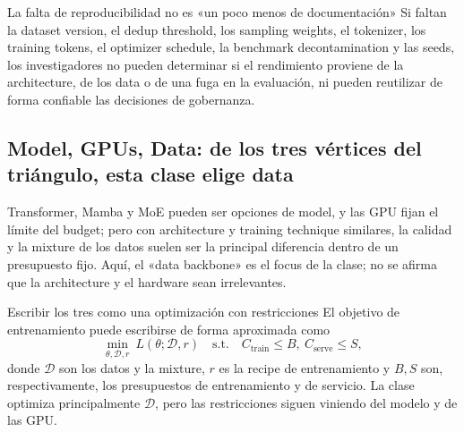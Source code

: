 \begin{warningbox}{La falta de reproducibilidad no es «un poco menos de documentación»}
Si faltan la dataset version, el dedup threshold, los sampling weights, el tokenizer, los training tokens, el optimizer schedule, la benchmark decontamination y las seeds, los investigadores no pueden determinar si el rendimiento proviene de la architecture, de los data o de una fuga en la evaluación, ni pueden reutilizar de forma confiable las decisiones de gobernanza.
\end{warningbox}


\subsection{Model, GPUs, Data: de los tres vértices del triángulo, esta clase elige data}

Transformer, Mamba y MoE pueden ser opciones de model, y las GPU fijan el límite del budget; pero con architecture y training technique similares, la calidad y la mixture de los datos suelen ser la principal diferencia dentro de un presupuesto fijo. Aquí, el «data backbone» es el focus de la clase; no se afirma que la architecture y el hardware sean irrelevantes.


\begin{knowledgebox}{Escribir los tres como una optimización con restricciones}
El objetivo de entrenamiento puede escribirse de forma aproximada como
\[
\min_{\theta,\mathcal{D},r}\ L(\theta;\mathcal{D},r)
\quad\text{s.t.}\quad
C_{\text{train}}\le B,\ C_{\text{serve}}\le S,
\]
donde $\mathcal{D}$ son los datos y la mixture, $r$ es la recipe de entrenamiento y $B,S$ son, respectivamente, los presupuestos de entrenamiento y de servicio. La clase optimiza principalmente $\mathcal{D}$, pero las restricciones siguen viniendo del modelo y de las GPU.
\end{knowledgebox}


